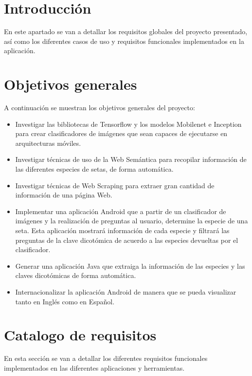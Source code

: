 
\section{Introducción}

En este apartado se van a detallar los requisitos globales del proyecto presentado, así como los diferentes casos de uso y requisitos funcionales implementados en la aplicación.

\section{Objetivos generales}

A continuación se muestran los objetivos generales del proyecto:

\begin{itemize}
	\item Investigar las bibliotecas de Tensorflow y los modelos Mobilenet e Inception para crear clasificadores de imágenes que sean capaces de ejecutarse en arquitecturas móviles.
	\item Investigar técnicas de uso de la Web Semántica para recopilar información de las diferentes especies de setas, de forma automática.
	\item Investigar técnicas de Web Scraping para extraer gran cantidad de información de una página Web.
	\item Implementar una aplicación Android que a partir de un clasificador de imágenes y la realización de preguntas al usuario, determine la especie de una seta. Esta aplicación mostrará información de cada especie y filtrará las preguntas de la clave dicotómica de acuerdo a las especies devueltas por el clasificador.
	\item Generar una aplicación Java que extraiga la información de las especies y las claves dicotómicas de forma automática.
	\item Internacionalizar la aplicación Android de manera que se pueda visualizar tanto en Inglés como en Español.
\end{itemize}

\section{Catalogo de requisitos}

En esta sección se van a detallar los diferentes requisitos funcionales implementados en las diferentes aplicaciones y herramientas.

